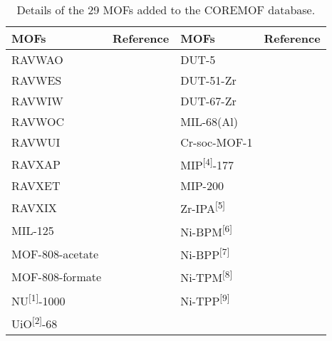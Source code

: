 \begin{table}[H]
    \centering
    \caption{%
        Details of the 29 MOFs added to the COREMOF database.
    }\label{tbl:extra-mofs}
    \begin{tabular}{@{}llll@{}}
        MOFs & Reference & MOFs & Reference\\
        \midrule
        RAVWAO & \citep{gulcayBiocompatibleMOFsStorage2019} & 
        DUT-5 & \citep{senkovskaNewHighlyPorous2009} \\
        RAVWES & \citep{gulcayBiocompatibleMOFsStorage2019} &
        DUT-51-Zr & \citep{bonZrIvHf2012}\\
        RAVWIW & \citep{gulcayBiocompatibleMOFsStorage2019} &
        DUT-67-Zr & \citep{bonZrHfBasedMetal2013}\\
        RAVWOC & \citep{gulcayBiocompatibleMOFsStorage2019} &
        MIL-68(Al) & \citep{yangProbingAdsorptionPerformance2012}\\
        RAVWUI & \citep{gulcayBiocompatibleMOFsStorage2019} &
        Cr-soc-MOF-1 & \citep{nandiRevisitingWaterSorption2019}\\
        RAVXAP & \citep{gulcayBiocompatibleMOFsStorage2019} &
        MIP\textsuperscript{{[}4{]}}-177 & \citep{wangPhaseTransformableUltrastable2018} \\
        RAVXET & \citep{gulcayBiocompatibleMOFsStorage2019} &
        MIP-200 & \citep{wangRobustLargeporeZirconium2018} \\
        RAVXIX & \citep{gulcayBiocompatibleMOFsStorage2019} &
        Zr-IPA\textsuperscript{{[}5{]}} & \citep{wangMesoporousZirconiumIsophthalateMultifunctional2020} \\
        MIL-125 & \citep{soaresComputationalEvaluationChemical2019} &
        Ni-BPM\textsuperscript{{[}6{]}} & \citep{zhengMolecularInsightFluorocarbon2020}\\
        MOF-808-acetate & \citep{soaresComputationalEvaluationChemical2019} &
        Ni-BPP\textsuperscript{{[}7{]}} & \citep{zhengMolecularInsightFluorocarbon2020}\\
        MOF-808-formate & \citep{soaresComputationalEvaluationChemical2019} &
        Ni-TPM\textsuperscript{{[}8{]}} & \citep{zhengMolecularInsightFluorocarbon2020}\\
        NU\textsuperscript{{[}1{]}}-1000 & \citep{soaresComputationalEvaluationChemical2019} &
        Ni-TPP\textsuperscript{{[}9{]}} & \citep{zhengMolecularInsightFluorocarbon2020}\\
        UiO\textsuperscript{{[}2{]}}-68 & \citep{soaresComputationalEvaluationChemical2019} &

\end{tabular}
\end{table}
